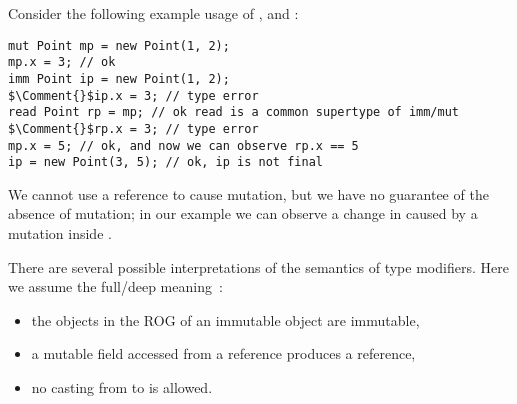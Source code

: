 \noindent Consider the following  example usage of \Q@mut@, \Q@imm@ and \Q@read@:
\begin{lstlisting}
mut Point mp = new Point(1, 2);
mp.x = 3; // ok
imm Point ip = new Point(1, 2);
$\Comment{}$ip.x = 3; // type error
read Point rp = mp; // ok read is a common supertype of imm/mut
$\Comment{}$rp.x = 3; // type error
mp.x = 5; // ok, and now we can observe rp.x == 5
ip = new Point(3, 5); // ok, ip is not final
\end{lstlisting}
\noindent We cannot use a \Q@read@ reference to cause mutation, but we have no guarantee of the absence of mutation; in our example we can observe a change in \Q@rp@ caused by a mutation inside \Q@mp@.


There are several possible interpretations of the semantics of type modifiers.
Here we assume the full/deep meaning~\cite{??}:%
\begin{itemize}
  \item the objects in the ROG of an immutable object are immutable,
  \item a mutable field accessed from a \Q@read@ reference produces a \Q@read@ reference,
  \item no casting from \Q@read@ to \Q@mut@ is allowed.
\end{itemize}


